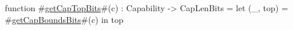 function #\hyperref[sailRISCVzgetCapTopBits]{getCapTopBits}#(c) : Capability -> CapLenBits =
    let (_, top) = #\hyperref[sailRISCVzgetCapBoundsBits]{getCapBoundsBits}#(c) in
    top
